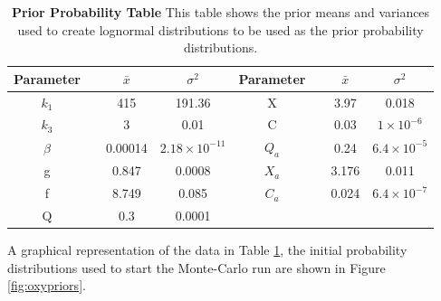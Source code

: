 \begin{table}[h]%
\renewcommand{\arraystretch}{1.5}
\begin{center}
\begin{tabular}{cccc|cccc}
\toprule
\textbf{Parameter} && ${\bar{x}}$ & $\sigma^2$ & \textbf{Parameter} && ${\bar{x}}$ & $\sigma^2$\\
\midrule
$k_1$ && 415 & 191.36 & X && 3.97 & 0.018\\
$k_3$ && 3 & 0.01 & C && 0.03 & $1\times 10^{-6}$\\
$\beta$ && 0.00014 & $2.18\times 10^{-11}$ & $Q_a$ && 0.24 & $6.4\times 10^{-5}$ \\
g && 0.847 & 0.0008 & $X_a$ && 3.176 & 0.011 \\
f && 8.749 & 0.085 & $C_a$ && 0.024 & $6.4\times 10^{-7}$ \\
Q && 0.3 & 0.0001\\
\bottomrule
\end{tabular}
\end{center}
\caption[First Prior Probability Table]{{\bf Prior Probability Table} This table shows the prior means and variances used to create lognormal distributions to be used as the prior probability distributions.
\label{tab:oxyProbstat}}
\end{table}

\noindent A graphical representation of the data in Table \ref{tab:oxyProbstat}, the initial probability distributions used to start the Monte-Carlo run are shown in Figure \ref{fig:oxypriors}.%

